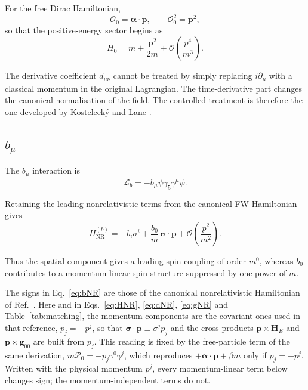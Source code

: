\documentclass[aps,prd,reprint,superscriptaddress,nofootinbib]{revtex4-2}
\newcommand{\NR}{\mathrm{NR}}
\begin{document}
	For the free Dirac Hamiltonian,
	\begin{equation}
		\mathcal O_0=\boldsymbol{\alpha}\cdot\mathbf p,
		\qquad
		\mathcal O_0^2=\mathbf p^2,
	\end{equation}
	so that the positive-energy sector begins as
	\begin{equation}
		H_0=m+\frac{\mathbf p^2}{2m}
		+\mathcal O\!\left(\frac{p^4}{m^3}\right).
	\end{equation}
	
	The derivative coefficient $d_{\mu\nu}$ cannot be treated by simply
	replacing $i\partial_\mu$ with a classical momentum in the original
	Lagrangian. The time-derivative part changes the canonical
	normalisation of the field. The controlled treatment is therefore the
	one developed by Kostelecký and Lane \cite{KosteleckyLane1999}.
	
	\subsection{$b_\mu$}\label{sec:bmuFW}
	
	The $b_\mu$ interaction is
	\begin{equation}
		\mathcal L_b
		=
		-b_\mu\bar\psi\gamma_5\gamma^\mu\psi .
	\end{equation}
	
	Retaining the leading nonrelativistic terms from the canonical FW
	Hamiltonian gives
	\begin{equation}
		H_{\NR}^{(b)}
		=
		-b_i\sigma^i
		+\frac{b_0}{m}\,
		\boldsymbol{\sigma}\cdot\mathbf p
		+\mathcal O\!\left(\frac{p^2}{m^2}\right).
		\label{eq:bNR}
	\end{equation}
	
	Thus the spatial component gives a leading spin coupling of order
	$m^0$, whereas $b_0$ contributes to a momentum-linear spin structure
	suppressed by one power of $m$.
	
	The signs in Eq.~\eqref{eq:bNR} are those of the canonical
nonrelativistic Hamiltonian of Ref.~\cite{KosteleckyLane1999}. Here and in Eqs.~\eqref{eq:HNR}, \eqref{eq:dNR}, \eqref{eq:gNR} and Table~\ref{tab:matching}, the
momentum components are the covariant ones used in that reference,
$p_j=-p^j$, so that $\boldsymbol{\sigma}\cdot\mathbf p\equiv\sigma^j p_j$
and the cross products $\mathbf p\times\mathbf H_E$ and $\mathbf p\times\mathbf g_{00}$ are built from $p_j$. This reading is
fixed by the free-particle term of the same derivation,
$m\mathcal P_0=-p_j\gamma^0\gamma^j$, which reproduces
$+\boldsymbol{\alpha}\cdot\mathbf p+\beta m$ only if $p_j=-p^j$.
Written with the physical momentum $p^j$, every momentum-linear term
below changes sign; the momentum-independent terms do not.
	
\end{document}
